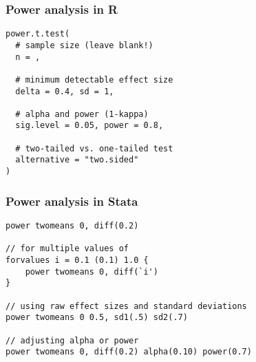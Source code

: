 

\begin{frame}[fragile]

\frametitle{Power analysis in R}
\small
\begin{verbatim}
power.t.test(
  # sample size (leave blank!)
  n = ,
  
  # minimum detectable effect size
  delta = 0.4, sd = 1,
  
  # alpha and power (1-kappa)
  sig.level = 0.05, power = 0.8,
  
  # two-tailed vs. one-tailed test
  alternative = "two.sided"
)
\end{verbatim}
\end{frame}


\begin{frame}[fragile]

\frametitle{Power analysis in Stata}
\small
\begin{verbatim}
power twomeans 0, diff(0.2)

// for multiple values of 
forvalues i = 0.1 (0.1) 1.0 {
    power twomeans 0, diff(`i')
}

// using raw effect sizes and standard deviations
power twomeans 0 0.5, sd1(.5) sd2(.7)

// adjusting alpha or power
power twomeans 0, diff(0.2) alpha(0.10) power(0.7)
\end{verbatim}
\end{frame}



